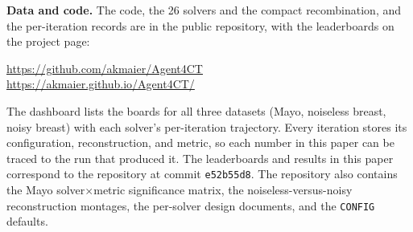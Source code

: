 \documentclass[AMA,twocolumn]{USG}
\begin{document}
\textbf{Data and code.} The code, the 26 solvers and the compact recombination, and the per-iteration records are in the public repository, with the leaderboards on the project page:
\begin{center}
\url{https://github.com/akmaier/Agent4CT}\\
\url{https://akmaier.github.io/Agent4CT/}
\end{center}
The dashboard lists the boards for all three datasets (Mayo, noiseless breast, noisy breast) with each solver's per-iteration trajectory. Every iteration stores its configuration, reconstruction, and metric, so each number in this paper can be traced to the run that produced it. The leaderboards and results in this paper correspond to the repository at commit \texttt{e52b55d8}. The repository also contains the Mayo solver$\times$metric significance matrix, the noiseless-versus-noisy reconstruction montages, the per-solver design documents, and the \texttt{CONFIG} defaults.


\end{document}
